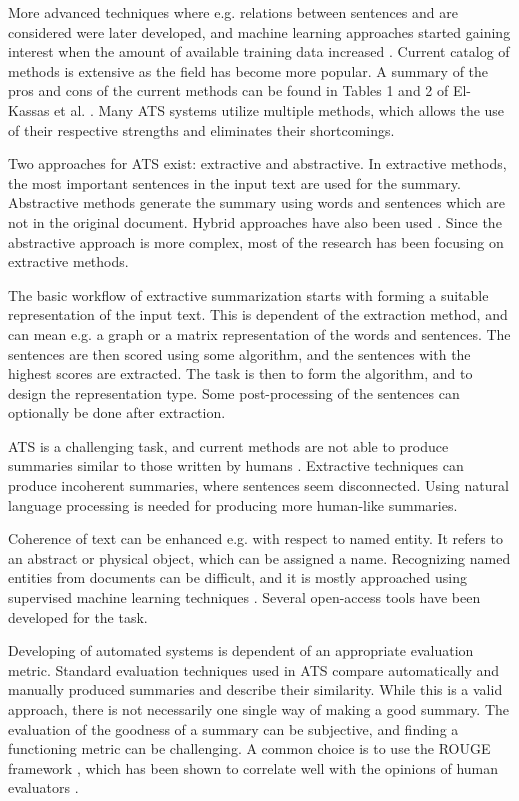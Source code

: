 \documentclass[conference]{IEEEtran}
\begin{document}
More advanced techniques where e.g. relations between sentences and are considered were later developed, and machine learning approaches started gaining interest when the amount of available training data increased \cite{erkan2004}. 
Current catalog of methods is extensive as the field has become more popular. 
A summary of the pros and cons of the current methods can be found in Tables 1 and 2 of El-Kassas et al. \cite{el-kassas2020}. 
Many ATS systems utilize multiple methods, which allows the use of their respective strengths and eliminates their shortcomings.

Two approaches for ATS exist: extractive and abstractive. In extractive methods, the most important sentences in the input text are used for the summary. Abstractive methods generate the summary using words and sentences which are not in the original document. 
Hybrid approaches have also been used \cite{el-kassas2020}. Since the abstractive approach is more complex, most of the research has been focusing on extractive methods.

The basic workflow of extractive summarization starts with forming a suitable representation of the input text. This is dependent of the extraction method, and can mean e.g. a graph or a matrix representation of the words and sentences. The sentences are then scored using some algorithm, and the sentences with the highest scores are extracted. The task is then to form the algorithm, and to design the representation type. Some post-processing of the sentences can optionally be done after extraction.

ATS is a challenging task, and current methods are not able to produce summaries similar to those written by humans \cite{el-kassas2020}. Extractive techniques can produce incoherent summaries, where sentences seem disconnected. Using natural language processing is needed for producing more human-like summaries. 

Coherence of text can be enhanced e.g. with respect to named entity. It refers to an abstract or physical object, which can be assigned a name. Recognizing named entities from documents can be difficult, and it is mostly approached using supervised machine learning techniques \cite{jiang2016}. Several open-access tools have been developed for the task.

Developing of automated systems is dependent of an appropriate evaluation metric. Standard evaluation techniques used in ATS compare automatically and manually produced summaries and describe their similarity. While this is a valid approach, there is not necessarily one single way of making a good summary. The evaluation of the goodness of a summary can be subjective, and finding a functioning metric can be challenging. A common choice is to use the ROUGE framework \cite{lin2004}, which has been shown to correlate well with the opinions of human evaluators \cite{sun2016}.
\end{document}
